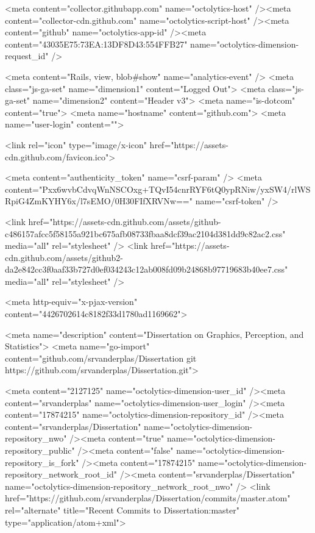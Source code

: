     <meta content="collector.githubapp.com" name="octolytics-host" /><meta content="collector-cdn.github.com" name="octolytics-script-host" /><meta content="github" name="octolytics-app-id" /><meta content="43035E75:73EA:13DF8D43:554FFB27" name="octolytics-dimension-request_id" />
    
    <meta content="Rails, view, blob#show" name="analytics-event" />
    <meta class="js-ga-set" name="dimension1" content="Logged Out">
    <meta class="js-ga-set" name="dimension2" content="Header v3">
    <meta name="is-dotcom" content="true">
    <meta name="hostname" content="github.com">
    <meta name="user-login" content="">

    
    <link rel="icon" type="image/x-icon" href="https://assets-cdn.github.com/favicon.ico">


    <meta content="authenticity_token" name="csrf-param" />
<meta content="Pxx6wvbCdvqWnNSCOxg+TQvI54cnrRYF6tQ0ypRNiw/yxSW4/rlWSRpiG4ZmKYHY6x/l7sEMO/0H30FIfXRVNw==" name="csrf-token" />

    <link href="https://assets-cdn.github.com/assets/github-c486157afcc5f58155a921bc675afb08733fbaa8dcf39ac2104d381dd9c82ac2.css" media="all" rel="stylesheet" />
    <link href="https://assets-cdn.github.com/assets/github2-da2e842cc3f0aaf33b727d0ef034243c12ab008fd09b24868b97719683b40ee7.css" media="all" rel="stylesheet" />
    
    


    <meta http-equiv="x-pjax-version" content="4426702614c8182f33d1780ad1169662">

      
  <meta name="description" content="Dissertation on Graphics, Perception, and Statistics">
  <meta name="go-import" content="github.com/srvanderplas/Dissertation git https://github.com/srvanderplas/Dissertation.git">

  <meta content="2127125" name="octolytics-dimension-user_id" /><meta content="srvanderplas" name="octolytics-dimension-user_login" /><meta content="17874215" name="octolytics-dimension-repository_id" /><meta content="srvanderplas/Dissertation" name="octolytics-dimension-repository_nwo" /><meta content="true" name="octolytics-dimension-repository_public" /><meta content="false" name="octolytics-dimension-repository_is_fork" /><meta content="17874215" name="octolytics-dimension-repository_network_root_id" /><meta content="srvanderplas/Dissertation" name="octolytics-dimension-repository_network_root_nwo" />
  <link href="https://github.com/srvanderplas/Dissertation/commits/master.atom" rel="alternate" title="Recent Commits to Dissertation:master" type="application/atom+xml">

